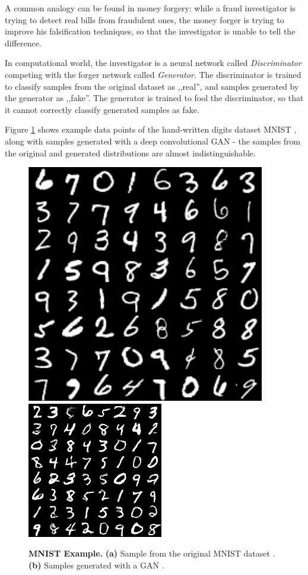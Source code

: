 \documentclass[12pt]{report}
\begin{document}
A common analogy can be found in money forgery: while a fraud investigator is trying to detect real bills from fraudulent ones, the money forger is trying to improve his falsification techniques, so that the investigator is unable to tell the difference.

In computational world, the investigator is a neural network called \textit{Discriminator} competing with the forger network called \textit{Generator}. The discriminator is trained to classify samples from the original dataset as ,,real'', and samples generated by the generator as ,,fake''. The generator is trained to fool the discriminator, so that it cannot correctly classify generated samples as fake.

\pagebreak
Figure \ref{fig:mnist} shows example data points of the hand-written digits dataset MNIST \cite{lecun_mnist_nodate}, along with samples generated with a deep convolutional GAN \cite{kim_dcgan-tensorflow_2018} - the samples from the original and generated distributions are almost indistinguishable.

\begin{figure}[t]
\centering
{}
{\includegraphics[width=.4\linewidth]{02_background/mnist_orig}}\hspace{0.5cm}
{\includegraphics[width=.4\linewidth]{02_background/mnist_dcgan}}
\caption{\label{fig:mnist} \textbf{MNIST Example.}
\textbf{(a)} Sample from the original MNIST dataset \cite{lecun_mnist_nodate}. \textbf{(b)} Samples generated with a GAN \cite{kim_dcgan-tensorflow_2018}.}
\end{figure}
\end{document}
